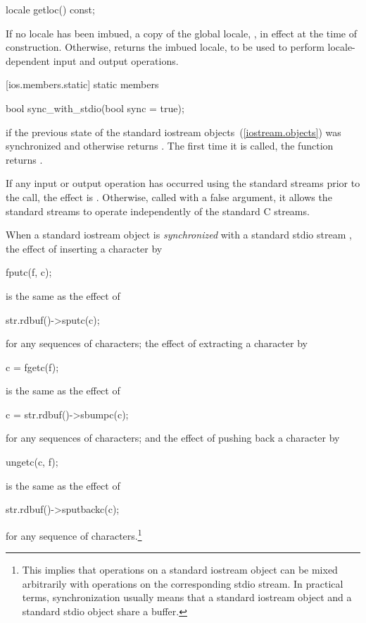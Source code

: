%
\begin{itemdecl}
locale getloc() const;
\end{itemdecl}

\begin{itemdescr}
\pnum
\returns
If no locale has been imbued, a copy of the global \Cpp locale,
,
in effect at the time of construction.
Otherwise, returns the imbued locale, to be used to
perform locale-dependent input and output operations.
\end{itemdescr}

[ios.members.static]{ static members}

%
\begin{itemdecl}
bool sync_with_stdio(bool sync = true);
\end{itemdecl}

\begin{itemdescr}
\pnum
\returns
{}
if the previous state of the standard iostream objects~(\ref{iostream.objects})
was synchronized and otherwise returns
.
The first time it is called,
the function returns
.

\pnum
\effects
If any input or output operation has occurred using the standard streams prior to the
call, the effect is
%
.
Otherwise, called with a false argument, it allows the standard streams to
operate independently of the standard C streams.

\pnum
When a standard iostream object  is
\textit{synchronized}
with a standard stdio stream , the effect of inserting a character  by
\begin{codeblock}
fputc(f, c);
\end{codeblock}
is the same as the effect of
\begin{codeblock}
str.rdbuf()->sputc(c);
\end{codeblock}
for any sequences of characters; the effect of extracting a character  by
\begin{codeblock}
c = fgetc(f);
\end{codeblock}
is the same as the effect of
\begin{codeblock}
c = str.rdbuf()->sbumpc(c);
\end{codeblock}
for any sequences of characters; and the effect of pushing back a character  by
\begin{codeblock}
ungetc(c, f);
\end{codeblock}
is the same as the effect of
\begin{codeblock}
str.rdbuf()->sputbackc(c);
\end{codeblock}
for any sequence of characters.\footnote{This implies that operations on a standard iostream object can be mixed arbitrarily
with operations on the corresponding stdio stream. In practical terms, synchronization
usually means that a standard iostream object and a standard stdio object share a
buffer.
}
\end{itemdescr}


